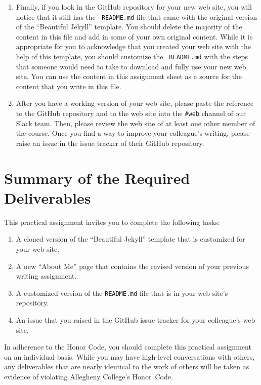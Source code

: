 \begin{enumerate}
  \item Finally, if you look in the GitHub repository for your new web site, you will notice that it still has the {\tt
    README.md} file that came with the original version of the ``Beautiful Jekyll'' template. You should delete the
    majority of the content in this file and add in some of your own original content. While it is appropriate for you
    to acknowledge that you created your web site with the help of this template, you should customize the {\tt
    README.md} with the steps that someone would need to take to download and fully use your new web site. You can use
    the content in this assignment sheet as a source for the content that you write in this file.

  \item After you have a working version of your web site, please paste the reference to the GitHub repository and to
    the web site into the {\tt \#web} channel of our Slack team. Then, please review the web site of at least one other
    member of the course. Once you find a way to improve your colleague's writing, please raise an issue in the issue
    tracker of their GitHub repository.

\end{enumerate}

\vspace*{-.175in}
\section*{Summary of the Required Deliverables}

This practical assignment invites you to complete the following tasks:

\vspace*{-.1in}
\begin{enumerate}
  \setlength{\itemsep}{0in}

  \item A cloned version of the ``Beautiful Jekyll'' template that is customized for your web site.
  \item A new ``About Me'' page that contains the revised version of your previous writing assignment.
  \item A customized version of the {\tt README.md} file that is in your web site's repository.
  \item An issue that you raised in the GitHub issue tracker for your colleague's web site.

\end{enumerate}
\vspace*{-.1in}

In adherence to the Honor Code, you should complete this practical assignment on an individual basis. While you may have
high-level conversations with others, any deliverables that are nearly identical to the work of others will be taken as
evidence of violating Allegheny College's \mbox{Honor Code}.


